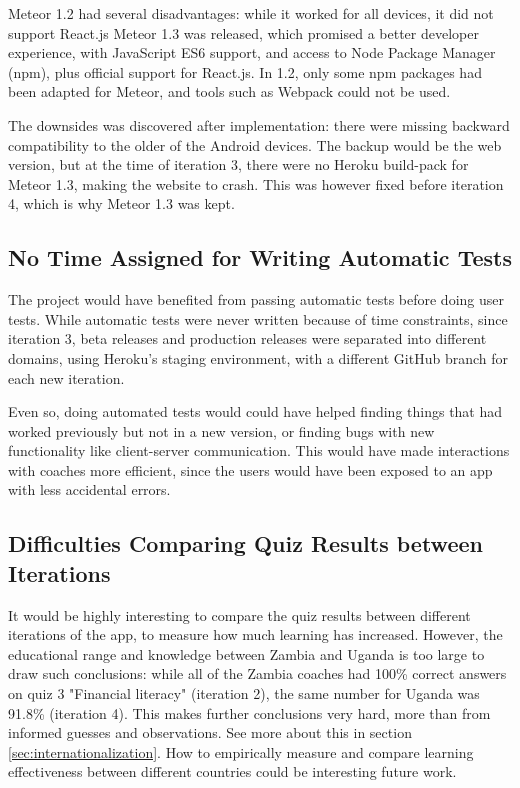 Meteor 1.2 had several disadvantages: while it worked for all devices, it did not support React.js Meteor 1.3 was released, which promised a better developer experience, with JavaScript ES6 support, and access to Node Package Manager (npm), plus official support for React.js. In 1.2, only some npm packages had been adapted for Meteor, and tools such as Webpack could not be used.

The downsides was discovered after implementation: there were missing backward compatibility to the older of the Android devices. The backup would be the web version, but at the time of iteration 3, there were no Heroku build-pack for Meteor 1.3, making the website to crash. This was however fixed before iteration 4, which is why Meteor 1.3 was kept.

\subsection{No Time Assigned for Writing Automatic Tests}
The project would have benefited from passing automatic tests before doing user tests. While automatic tests were never written because of time constraints, since iteration 3, beta releases and production releases were separated into different domains, using Heroku's staging environment, with a different GitHub branch for each new iteration.

Even so, doing automated tests would could have helped finding things that had worked previously but not in a new version, or finding bugs with new functionality like client-server communication. This would have made interactions with coaches more efficient, since the users would have been exposed to an app with less accidental errors.

\subsection{Difficulties Comparing Quiz Results between Iterations}
It would be highly interesting to compare the quiz results between different iterations of the app, to measure how much learning has increased. However, the educational range and knowledge between Zambia and Uganda is too large to draw such conclusions: while all of the Zambia coaches had 100\% correct answers on quiz 3 "Financial literacy" (iteration 2), the same number for Uganda was 91.8\% (iteration 4). This makes further conclusions very hard, more than from informed guesses and observations. See more about this in section \ref{sec:internationalization}. How to empirically measure and compare learning effectiveness between different countries could be interesting future work.


